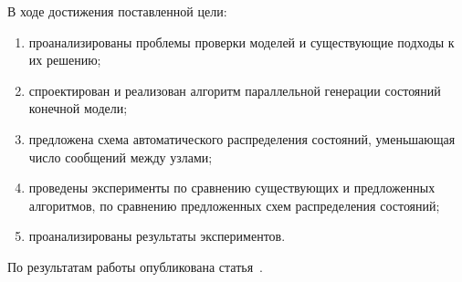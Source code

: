 \Conclusion

В ходе достижения поставленной цели:
\begin{enumerate}
\item проанализированы проблемы проверки моделей и существующие подходы к их решению;
\item спроектирован и реализован алгоритм параллельной генерации состояний конечной
  модели;
\item предложена схема автоматического распределения состояний, уменьшающая число
  сообщений между узлами;
\item проведены эксперименты по сравнению существующих и предложенных алгоритмов, по
  сравнению предложенных схем распределения состояний;
\item проанализированы результаты экспериментов.
\end{enumerate}

По результатам работы опубликована статья~\cite{Korotkov10Miem}.


